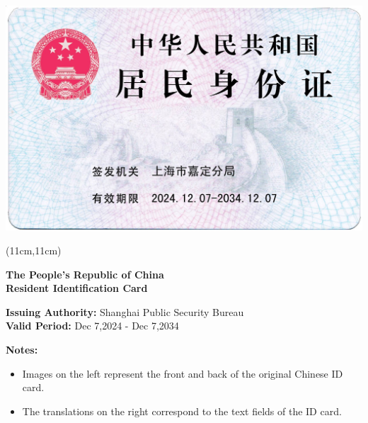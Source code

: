 \documentclass[a4paper,12pt]{article}
\begin{document}
	\begin{minipage}[t]{0.47\textwidth}
		\includegraphics[width=\textwidth]{image/back.jpg} 
	\end{minipage}%
	\hfill
	\begin{minipage}[t]{0.51\textwidth}
		\begin{textblock*}{2cm}(11cm,11cm) %
		\end{textblock*}
		\begin{tcolorbox}[colframe=black, colback=white]
			\begin{spacing}{1.3}
				\centering
				
				\vskip 0.4cm
				
				\textbf{The People's Republic of China}\\
				{\large \textbf{Resident Identification Card}}\\
				
				\vskip 0.8cm
				
				{\scriptsize \textbf{Issuing Authority:} Shanghai Public Security Bureau}\\
				{\scriptsize \textbf{Valid Period:} Dec 7,2024 - Dec 7,2034}
			\end{spacing}
		\end{tcolorbox}
	\end{minipage}
	
	\vspace{1cm}
	\begin{flushleft}
		\textbf{Notes:}
		\begin{itemize}
			\item Images on the left represent the front and back of the original Chinese ID card.
			\item The translations on the right correspond to the text fields of the ID card.
		\end{itemize}
	\end{flushleft}
\end{document}
